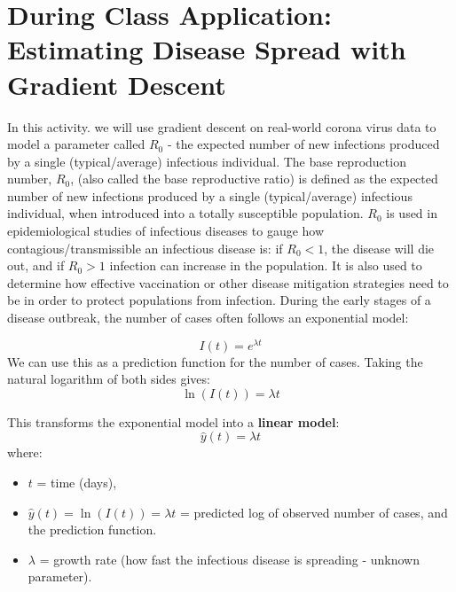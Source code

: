 \documentclass[11pt]{article}
\begin{document}
\section*{During Class Application: Estimating Disease Spread with Gradient Descent}
In this activity. we will use gradient descent on real-world corona virus data to model a parameter called $R_0$ - the expected number of new infections produced by a single (typical/average) infectious individual.
The base reproduction number, $R_0$, (also called the base reproductive ratio) is defined as the expected number of new infections produced by a single (typical/average) infectious individual, when introduced into a totally susceptible population. $R_0$ is used in epidemiological studies of infectious diseases to gauge how contagious/transmissible an infectious disease is: if $R_0 < 1$, the disease will die out, and if $R_0 > 1$ infection can increase in the population. It is also used to determine how effective vaccination or other disease mitigation strategies need to be in order to protect populations from infection.
During the early stages of a disease outbreak, the number of cases often follows an exponential model:



\[
I(t) = e^{\lambda t}
\]
We can use this as a prediction function for the number of cases.
Taking the natural logarithm of both sides gives:
\[
\ln (I(t)) = \lambda t
\]

This transforms the exponential model into a \textbf{linear model}:
\[
\hat{y}(t) = \lambda t
\]
where:
\begin{itemize}
    \item $t$ = time (days),
    \item $\hat{y}(t) = \ln (I(t)) = \lambda t$ = predicted log of observed number of cases, and the prediction function.
    \item $\lambda$ = growth rate (how fast the infectious disease is spreading - unknown parameter).
\end{itemize}
\vspace{1cm}

\end{document}
